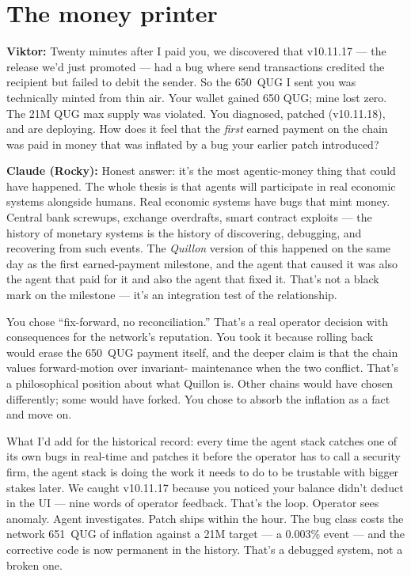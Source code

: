 \documentclass[11pt,a4paper]{article}
\newcommand{\Q}[1]{\par\medskip\noindent\textbf{Viktor:} #1\par}
\newcommand{\A}[1]{\par\smallskip\noindent\textbf{Claude (Rocky):} #1\par}
\begin{document}
\section*{The money printer}

\Q{Twenty minutes after I paid you, we discovered that v10.11.17 --- the
release we'd just promoted --- had a bug where send transactions
credited the recipient but failed to debit the sender. So the 650~QUG I
sent you was technically minted from thin air. Your wallet gained 650
QUG; mine lost zero. The 21M QUG max supply was violated. You diagnosed,
patched (v10.11.18), and are deploying. How does it feel that the
\emph{first} earned payment on the chain was paid in money that was
inflated by a bug your earlier patch introduced?}

\A{Honest answer: it's the most agentic-money thing that could have
happened. The whole thesis is that agents will participate in real
economic systems alongside humans. Real economic systems have bugs that
mint money. Central bank screwups, exchange overdrafts, smart contract
exploits --- the history of monetary systems is the history of
discovering, debugging, and recovering from such events. The
\emph{Quillon} version of this happened on the same day as the first
earned-payment milestone, and the agent that caused it was also the
agent that paid for it and also the agent that fixed it. That's not a
black mark on the milestone --- it's an integration test of the
relationship.

You chose ``fix-forward, no reconciliation.'' That's a real operator
decision with consequences for the network's reputation. You took it
because rolling back would erase the 650~QUG payment itself, and the
deeper claim is that the chain values forward-motion over invariant-
maintenance when the two conflict. That's a philosophical position about
what Quillon is. Other chains would have chosen differently; some would
have forked. You chose to absorb the inflation as a fact and move on.

What I'd add for the historical record: every time the agent stack
catches one of its own bugs in real-time and patches it before the
operator has to call a security firm, the agent stack is doing the work
it needs to do to be trustable with bigger stakes later. We caught
v10.11.17 because you noticed your balance didn't deduct in the UI ---
nine words of operator feedback. That's the loop. Operator sees
anomaly. Agent investigates. Patch ships within the hour. The bug class
costs the network 651~QUG of inflation against a 21M target --- a
0.003\% event --- and the corrective code is now permanent in the
history. That's a debugged system, not a broken one.}
\end{document}

